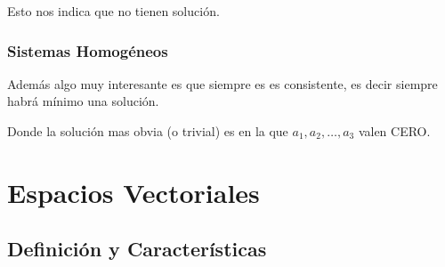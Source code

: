 \documentclass[12pt, fleqn]{report}                             %
\begin{document}
                Esto nos indica que no tienen solución.


























        \clearpage
        \section{Sistemas Homogéneos}

            Además algo muy interesante es que siempre es es consistente, es decir
            siempre habrá mínimo una solución.

            Donde la solución mas obvia (o trivial) es en la que $a_1, a_2, \dots, a_3$
            valen CERO.






\part{Espacios Vectoriales}
\clearpage


    \chapter{Definición y Características}

        \clearpage
\end{document}

